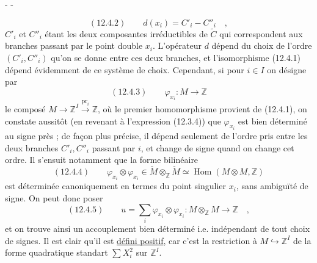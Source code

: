 \begin{center}-  -\end{center}
\[
(12.4.2)\qquad d(x_i)=C'_i-C''_i\quad,
\]
$C'_i$ et $C''_i$ étant les deux composantes irréductibles de $\widetilde C$ qui correspondent aux branches passant par le point double $x_i$. L'opérateur $d$ dépend du choix de l'ordre $(C'_i,C''_i)$ qu'on se donne entre ces deux branches, et l'isomorphisme (12.4.1) dépend évidemment de ce système de choix. Cependant, si pour $i\in I$ on désigne par
\[
(12.4.3)\qquad\varphi_{x_i}:M\longrightarrow\mathbb Z
\]
le composé $M\longrightarrow\mathbb Z^I\xrightarrow{\mathrm{pr}_i}\mathbb Z$, où le premier homomorphisme provient de (12.4.1), on constate aussitôt (en revenant à l'expression (12.3.4)) que $\varphi_{x_i}$ est bien déterminé au signe près ; de façon plus précise, il dépend seulement de l'ordre pris entre les deux branches $C'_i,C''_i$ passant par $i$, et change de signe quand on change cet ordre. Il s'ensuit notamment que la forme bilinéaire
\[
(12.4.4)\qquad\varphi_{x_i}\otimes\varphi_{x_i}\in\check M\otimes_{\mathbb Z}\check M\simeq\operatorname{Hom}(M\otimes M,\mathbb Z)
\]
est déterminée canoniquement en termes du point singulier $x_i$, sans ambiguïté de signe. On peut donc poser
\[
(12.4.5)\qquad u=\sum_i\varphi_{x_i}\otimes\varphi_{x_i}:M\otimes_{\mathbb Z}M\longrightarrow\mathbb Z\quad,
\]
et on trouve ainsi un accouplement bien déterminé i.e. indépendant de tout choix de signes. Il est clair qu'il est \uline{défini positif}, car c'est la restriction à $M\hookrightarrow\mathbb Z^I$ de la forme quadratique standart $\sum X_i^2$ sur $\mathbb Z^I$.

